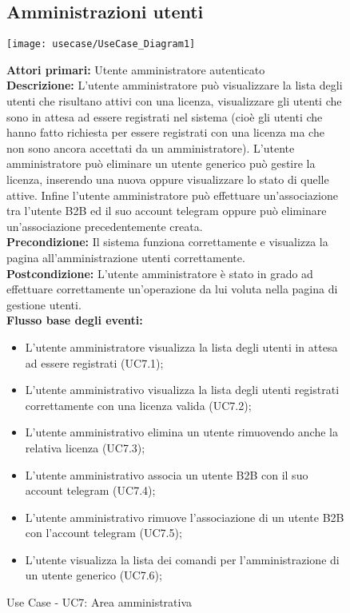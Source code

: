 \begin{figure}[h!]
\subsection{Amministrazioni utenti}
   \begin{center}
    \texttt{[image: usecase/UseCase\_Diagram1]} 
    \caption{Use Case - UC7: Area amministrativa}
    \end{center}
    
    \textbf{Attori primari:}   Utente amministratore autenticato\\
    
\textbf{Descrizione:} L'utente amministratore può visualizzare la lista degli utenti che risultano attivi con una licenza, visualizzare gli utenti che sono in attesa ad essere registrati nel sistema (cioè gli utenti che hanno fatto richiesta per essere registrati con una licenza ma che non sono ancora accettati da un amministratore). L'utente amministratore può eliminare un utente generico può gestire la licenza, inserendo una nuova oppure visualizzare lo stato di quelle attive. Infine l'utente amministratore può effettuare un'associazione tra l'utente B2B ed il suo account telegram oppure può eliminare un'associazione precedentemente creata. \\

\textbf{Precondizione:}   Il sistema funziona correttamente e visualizza la pagina all'amministrazione utenti correttamente. \\
 
\textbf{Postcondizione:}  L'utente amministratore è stato in grado ad effettuare correttamente  un'operazione da lui voluta nella pagina di gestione utenti.\\


\textbf{Flusso base degli eventi:} 

\begin{itemize}

\item L'utente amministratore visualizza la lista degli utenti in attesa ad essere registrati (UC7.1);
\item L'utente amministrativo visualizza la lista degli utenti registrati correttamente con una licenza valida (UC7.2);
\item L'utente amministrativo elimina un utente rimuovendo anche la relativa licenza (UC7.3);
\item L'utente amministrativo associa un utente B2B con il suo account telegram (UC7.4);
\item L'utente amministrativo rimuove l'associazione di un utente B2B con l'account telegram (UC7.5);
\item L'utente visualizza la lista dei comandi per l'amministrazione di un utente generico (UC7.6);
\end{itemize}  

\end{figure}






